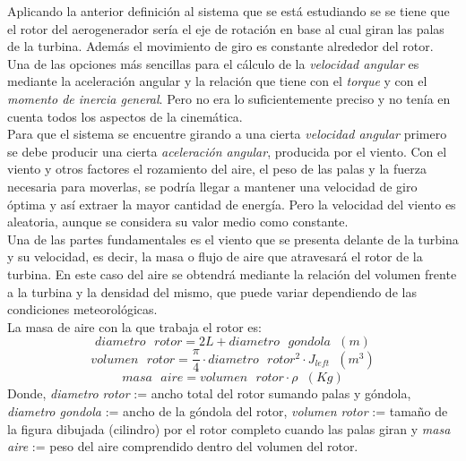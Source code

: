Aplicando la anterior definición al sistema que se está estudiando se se tiene que el rotor del aerogenerador sería el eje de rotación en base al cual giran las palas de la turbina. Además el movimiento de giro es constante alrededor del rotor.\\

Una de las opciones más sencillas para el cálculo de la \textit{velocidad angular} es mediante la aceleración angular y la relación que tiene con el \textit{torque} y con el \textit{momento de inercia general}. Pero no era lo suficientemente preciso y no tenía en cuenta todos los aspectos de la cinemática. \\
 
Para que el sistema se encuentre girando a una cierta \textit{velocidad angular} primero se debe producir una cierta \textit{aceleración angular}, producida por el viento. Con el viento y otros factores el rozamiento del aire, el peso de las palas y la fuerza necesaria para moverlas, se podría llegar a mantener una velocidad de giro óptima y así extraer la mayor cantidad de energía. Pero la velocidad del viento es aleatoria, aunque se considera su valor medio como constante.\\


Una de las partes fundamentales es el viento que se presenta delante de la turbina y su velocidad, es decir, la masa o flujo de aire que atravesará el rotor de la turbina. En este caso del aire se obtendrá mediante la relación del volumen frente a la turbina y la densidad del mismo, que puede variar dependiendo de las condiciones meteorológicas.\\

La masa de aire con la que trabaja el rotor es:
\begin{equation}
     diametro \text{ } rotor = 2L + diametro \text{ } gondola \hspace{7pt} (m)
\end{equation}
\begin{equation}
    volumen \text{ } rotor = \dfrac{\pi}{4} \cdot diametro \text{ } rotor^2 \cdot J_{left} \hspace{7pt} (m^3) 
\end{equation}
\begin{equation}
    masa \text{ } aire = volumen \text{ } rotor \cdot \rho \hspace{7pt} (Kg)
\label{def:masa_aire}
\end{equation}
Donde, \textit{diametro rotor} := ancho total del rotor sumando palas y góndola, \textit{diametro gondola} := ancho de la góndola del rotor, \textit{volumen rotor} := tamaño de la figura dibujada (cilindro) por el rotor completo cuando las palas giran y \textit{masa aire} := peso del aire comprendido dentro del volumen del rotor.\\

